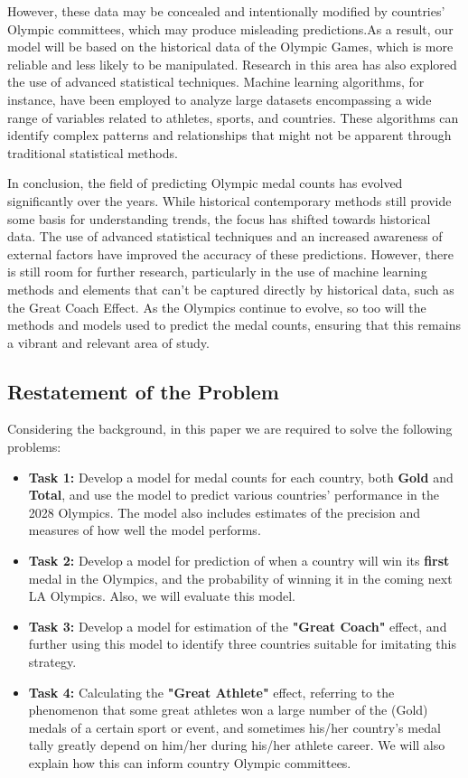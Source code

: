 However, these data may be concealed and intentionally modified by countries' Olympic committees, which may produce misleading predictions.As a result, our model will be based on the historical data of the Olympic Games, which is more reliable and less likely to be manipulated.
Research in this area has also explored the use of advanced statistical techniques. Machine learning algorithms, for instance, have been employed to analyze large datasets encompassing a wide range of variables related to athletes, sports, and countries. These algorithms can identify complex patterns and relationships that might not be apparent through traditional statistical methods.

In conclusion, the field of predicting Olympic medal counts has evolved significantly over the years. While historical contemporary methods still provide some basis for understanding trends, the focus has shifted towards historical data. The use of advanced statistical techniques and an increased awareness of external factors have improved the accuracy of these predictions. 
However, there is still room for further research, particularly in the use of machine learning methods and elements that can't be captured directly by historical data, such as the Great Coach Effect. As the Olympics continue to evolve, so too will the methods and models used to predict the medal counts, ensuring that this remains a vibrant and relevant area of study.

\subsection{Restatement of the Problem}
Considering the background, in this paper we are required to solve the following problems:

\begin{itemize}
\item{\bf Task 1:} Develop a model for medal counts for each country, both \textbf{Gold} and \textbf{Total}, and use the model to predict various countries' performance in the 2028 Olympics. The model also includes estimates of the precision and measures of how well the model performs.

\item{\bf Task 2:} Develop a model for prediction of when a country will win its \textbf{first} medal in the Olympics, and the probability of winning it in the coming next LA Olympics. Also, we will evaluate this model.

\item{\bf Task 3:} Develop a model for estimation of the \textbf{"Great Coach"} effect, and further using this model to identify three countries suitable for imitating this strategy.

\item{\bf Task 4:} Calculating the \textbf{"Great Athlete"} effect, referring to the phenomenon that some great athletes won a large number of the (Gold) medals of a certain sport or event, and sometimes his/her country's medal tally greatly depend on him/her during his/her athlete career. We will also explain how this can inform country Olympic committees.
\end{itemize}

